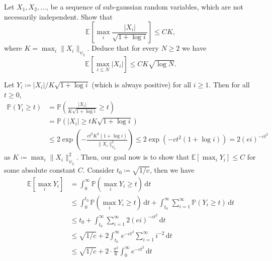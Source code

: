 \begin{problem*}[Exercise 2.5.10]\label{ex2.5.10}
	Let \(X_1, X_2, \dots \), be a sequence of sub-gaussian random variables, which are not necessarily independent. Show that
	\[
		\mathbb{E}_{}\left[\max _i \frac{\lvert X_i \rvert }{\sqrt{1 + \log i} } \right]
		\leq C K,
	\]
	where \(K = \max _i \lVert X_i \rVert _{\psi _2}\). Deduce that for every \(N \geq 2\) we have
	\[
		\mathbb{E}_{}\left[\max _{i \leq N} \lvert X_i \rvert \right]
		\leq CK \sqrt{\log N} .
	\]
\end{problem*}
\begin{answer}
	Let \(Y_i \coloneqq \vert X_i \vert / K \sqrt{1 + \log i} \) (which is always positive) for all \(i \geq 1\). Then for all \(t \geq 0\),
	\[
		\begin{split}
			\mathbb{P} (Y_i \geq t)
			 & = \mathbb{P} \left( \frac{\vert X_i \vert}{K \sqrt{1 + \log i}} \geq t \right) \\
			 & = \mathbb{P} \left( \vert X_i \vert \geq t K \sqrt{1 + \log i}  \right)        \\
			 & \leq 2 \exp (- \frac{c t^2 K^2 (1 + \log i)}{\lVert X_i \rVert _{\psi _2}^2})
			\leq 2 \exp (- c t^2 (1 + \log i))
			= 2 (ei)^{-ct^2}
		\end{split}
	\]
	as \(K \coloneqq \max _i \lVert X_i \rVert _{\psi _2}^2\). Then, our goal now is to show that \(\mathbb{E}[\max _i Y_i] \leq C \) for some absolute constant \(C\). Consider \(t_0 \coloneqq \sqrt{1 / c} \), then we have
	\begin{align*}
		\mathbb{E}\left[ \max _i Y_i \right]
		 & = \int_{0}^{\infty} \mathbb{P} \left( \max _i Y_i \geq t \right) \,\mathrm{d}t                                                                                                     \\
		 & \leq \int_{0}^{t_0} \mathbb{P} \left( \max _i Y_i \geq t \right)  \,\mathrm{d}t + \int_{t_0}^{\infty} \sum_{i=1}^{\infty} \mathbb{P} (Y_i \geq t) \,\mathrm{d}t \tag*{union bound} \\
		 & \leq t_0 + \int_{t_0}^{\infty} \sum_{i=1}^{\infty} 2 (ei)^{-ct^2} \,\mathrm{d}t                                                                                                    \\
		 & \leq \sqrt{1 / c}  + 2\int_{t_0}^{\infty} e^{-ct^2} \sum_{i=1}^{\infty} i^{-2} \,\mathrm{d}t                                                                                       \\
		 & \leq \sqrt{1 / c} + 2 \cdot \frac{\pi ^2}{6} \int_{0}^{\infty} e^{-ct^2} \,\mathrm{d}t

\end{align*}
\end{answer}
